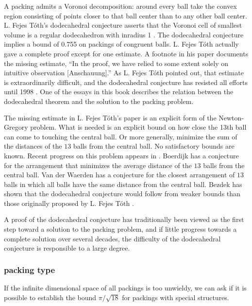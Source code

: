 A packing admits a Voronoi decomposition: around
every ball take the convex region consisting of points closer to that ball
center than to any other ball center.   L. Fejes T\'oth's
dodecahedral
conjecture asserts that the Voronoi cell of smallest volume is
a regular dodecahedron with inradius 1 \cite{Fej42}.
The dodecahedral conjecture implies a bound of 0.755 on 
packings of congruent balls.  
L. Fejes T\'oth actually gave a complete proof except
for one estimate. A footnote in his paper documents the missing estimate, 
``In the
proof, we have relied to some extent solely on intuitive
observation [Anschauung].''
As L. Fejes T\'oth pointed out, that estimate is extraordinarily
difficult, and the dodecahedral conjecture has resisted all efforts
until 1998 \cite{McL98}. One of the
essays in this book describes the relation between the dodecahedral
theorem and the solution to the packing problem.

The missing estimate in L. Fejes T\'oth's paper is an explicit form
of the Newton-Gregory problem.  What is needed is an explicit bound
on how close the 13th ball can come to touching the central
ball.  Or more generally, minimize the sum of the distances
of the $13$ balls from the central ball.
No satisfactory bounds are known.  Recent progress on this problem appears in
\cite{BoSz03}.  Boerdijk has a conjecture for the arrangement
that minimizes the average distance of the $13$ balls from the
central ball.
Van der Waerden
has a conjecture for the closest arrangement of $13$ balls in which
all balls have the same distance from the central ball.
Bezdek has shown that the dodecahedral conjecture would follow from
weaker bounds than those originally proposed by L. Fejes T\'oth
\cite{Bez97}.

A proof of the dodecahedral conjecture has traditionally been
viewed as the first step toward a solution to the packing problem,
and if little progress towards a complete
solution over several decades, the difficulty of the dodecahedral
conjecture is responsible to a large degree.

\subsubsection{packing type}

If the infinite dimensional space of all packings is too unwieldy,
we can ask if it is possible to establish the bound $\pi/\sqrt{18}$
for packings with special structures.

